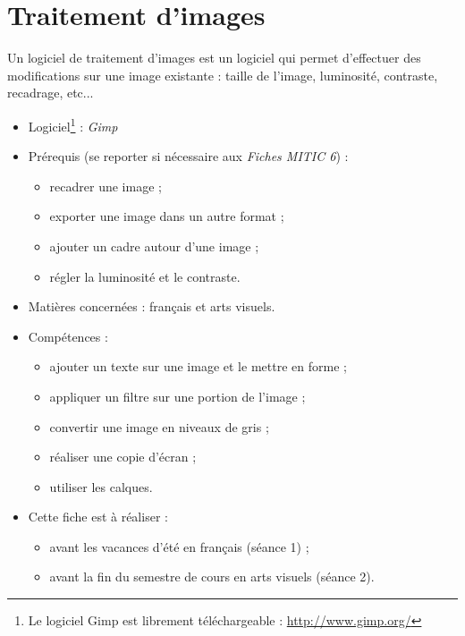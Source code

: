 \chapter{Traitement d'images}  

Un logiciel de traitement d'images est un logiciel qui permet d'effectuer des modifications sur une image existante : taille de l'image, luminosité, contraste, recadrage, etc...\\

{\footnotesize
\begin{itemize}
\item Logiciel\footnote{Le logiciel Gimp est librement téléchargeable : \url{http://www.gimp.org/}} : \emph{Gimp}
\item Prérequis (se reporter si nécessaire aux \emph{Fiches MITIC 6}) :
        \begin{itemize}
        \item recadrer une image ;
        \item exporter une image dans un autre format ;
        \item ajouter un cadre autour d'une image ;
        \item régler la luminosité et le contraste.
        \end{itemize}
\item Matières concernées : français et arts visuels.
\item Compétences : 
        \begin{itemize}
        \item ajouter un texte sur une image et le mettre en forme ;
        \item appliquer un filtre sur une portion de l'image ;
        \item convertir une image en niveaux de gris ;
        \item réaliser une copie d'écran ;
        \item utiliser les calques.
        \end{itemize}
\item Cette fiche est à réaliser :
        \begin{itemize}
        \item avant les vacances d'été en français (séance 1) ;
        \item avant la fin du semestre de cours en arts visuels (séance 2).
        \end{itemize}
\end{itemize}
} %

